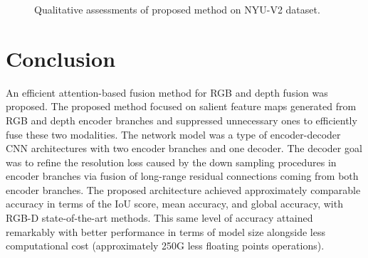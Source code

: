 \documentclass[journal,transmag]{IEEEtran}
\begin{document}
\begin{figure*}
	  \hspace{0.001cm}
	 \hspace{0.001cm}
	 \hspace{0.001cm}
	 \hspace{0.01cm}
	  \hspace{0.001cm}
	 \hspace{0.05cm}
	 \hspace{0.001cm}
	  \vspace{0.1cm}
	  \vspace{0.1cm}
	\caption{Qualitative assessments of proposed method on NYU-V2 dataset.}
	\label{fig:nyu_sampel_results}
\end{figure*}
\section{Conclusion}
\label{sec:5}
An efficient attention-based fusion method for RGB and depth fusion was proposed. The proposed  method focused on salient feature maps generated from RGB and depth encoder branches and suppressed unnecessary ones to efficiently fuse these two modalities. The network model was a type of encoder-decoder CNN architectures with two encoder branches and one decoder. The decoder goal was to refine the resolution loss caused by the down sampling procedures in encoder branches via fusion of long-range residual connections coming from both encoder branches. The proposed architecture achieved approximately comparable accuracy  in terms of the IoU score, mean accuracy, and global accuracy, with RGB-D state-of-the-art methods. This same level of accuracy attained  remarkably with   better performance in terms of model size alongside less computational cost (approximately 250G less floating points operations). 


























\ifCLASSOPTIONcaptionsoff
  \newpage
\fi









\end{document}
